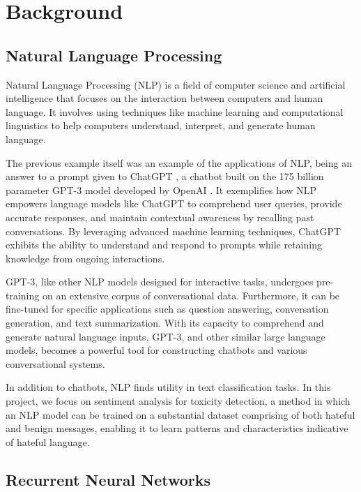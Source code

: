 \chapter{Background}

\section{Natural Language Processing}

Natural Language Processing (NLP) is a field of computer science and artificial intelligence that focuses on the interaction between computers and human language. It involves using techniques like machine learning and computational linguistics to help computers understand, interpret, and generate human language.

The previous example itself was an example of the applications of NLP, being an answer to a prompt given to ChatGPT \cite{ChatGPT}, a chatbot built on the 175 billion parameter GPT-3 model developed by OpenAI \cite{gpt_3}. It exemplifies how NLP empowers language models like ChatGPT to comprehend user queries, provide accurate responses, and maintain contextual awareness by recalling past conversations. By leveraging advanced machine learning techniques, ChatGPT exhibits the ability to understand and respond to prompts while retaining knowledge from ongoing interactions.

GPT-3, like other NLP models designed for interactive tasks, undergoes pre-training on an extensive corpus of conversational data. Furthermore, it can be fine-tuned for specific applications such as question answering, conversation generation, and text summarization. With its capacity to comprehend and generate natural language inputs, GPT-3, and other similar large language models, becomes a powerful tool for constructing chatbots and various conversational systems.

In addition to chatbots, NLP finds utility in text classification tasks. In this project, we focus on sentiment analysis for toxicity detection, a method in which an NLP model can be trained on a substantial dataset comprising of both hateful and benign messages, enabling it to learn patterns and characteristics indicative of hateful language.

\section{Recurrent Neural Networks}

